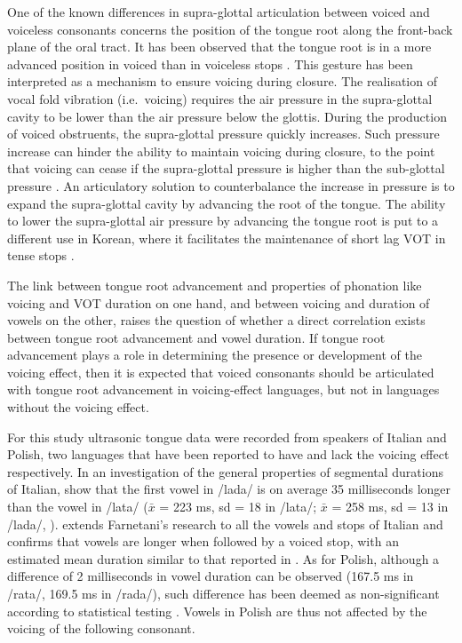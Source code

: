 \documentclass[authoryear, twocolumn]{elsarticle}
\begin{document}
One of the known differences in supra-glottal articulation between
voiced and voiceless consonants concerns the position of the tongue root
along the front-back plane of the oral tract. It has been observed that
the tongue root is in a more advanced position in voiced than in
voiceless stops \citep{kent1969,perkell1969,westbury1983}. This gesture
has been interpreted as a mechanism to ensure voicing during closure.
The realisation of vocal fold vibration (i.e.~voicing) requires the air
pressure in the supra-glottal cavity to be lower than the air pressure
below the glottis. During the production of voiced obstruents, the
supra-glottal pressure quickly increases. Such pressure increase can
hinder the ability to maintain voicing during closure, to the point that
voicing can cease if the supra-glottal pressure is higher than the
sub-glottal pressure \citep{ohala2011}. An articulatory solution to
counterbalance the increase in pressure is to expand the supra-glottal
cavity by advancing the root of the tongue. The ability to lower the
supra-glottal air pressure by advancing the tongue root is put to a
different use in Korean, where it facilitates the maintenance of short
lag VOT in tense stops \citep{ahn2016}.

The link between tongue root advancement and properties of phonation
like voicing and VOT duration on one hand, and between voicing and
duration of vowels on the other, raises the question of whether a direct
correlation exists between tongue root advancement and vowel duration.
If tongue root advancement plays a role in determining the presence or
development of the voicing effect, then it is expected that voiced
consonants should be articulated with tongue root advancement in
voicing-effect languages, but not in languages without the voicing
effect.

For this study ultrasonic tongue data were recorded from speakers of
Italian and Polish, two languages that have been reported to have and
lack the voicing effect respectively. In an investigation of the general
properties of segmental durations of Italian, \citet{farnetani1986} show
that the first vowel in /lada/ is on average 35 milliseconds longer than
the vowel in /lata/ (\(\bar{x}\) = 223 ms, sd = 18 in /lata/;
\(\bar{x}\) = 258 ms, sd = 13 in /lada/, \citealt[26]{farnetani1986}).
\citet{esposito2002} extends Farnetani's research to all the vowels and
stops of Italian and confirms that vowels are longer when followed by a
voiced stop, with an estimated mean duration similar to that reported in
\citet{farnetani1986}. As for Polish, although a difference of 2
milliseconds in vowel duration can be observed (167.5 ms in /rata/,
169.5 ms in /rada/), such difference has been deemed as non-significant
according to statistical testing \citep{keating1984}. Vowels in Polish
are thus not affected by the voicing of the following consonant.
\end{document}
